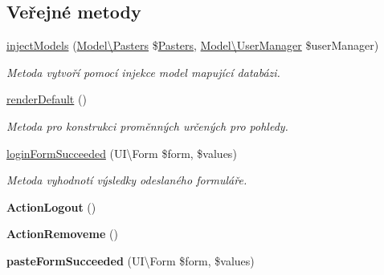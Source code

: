 \subsection*{Veřejné metody}
\begin{DoxyCompactItemize}
\item 
\hyperlink{classApp_1_1Presenters_1_1HomepagePresenter_a9f3ca2d8ad95a60ccbcce5566eb2a1f3}{inject\-Models} (\hyperlink{classApp_1_1Model_1_1Pasters}{Model\textbackslash{}\-Pasters} \$\hyperlink{classApp_1_1Model_1_1Pasters}{Pasters}, \hyperlink{classApp_1_1Model_1_1UserManager}{Model\textbackslash{}\-User\-Manager} \$user\-Manager)
\begin{DoxyCompactList}\small\item\em Metoda vytvoří pomocí injekce model mapující databázi. \end{DoxyCompactList}\item 
\hypertarget{classApp_1_1Presenters_1_1HomepagePresenter_a6903224ecfc8b81b2ab3269f574da84f}{\hyperlink{classApp_1_1Presenters_1_1HomepagePresenter_a6903224ecfc8b81b2ab3269f574da84f}{render\-Default} ()}\label{classApp_1_1Presenters_1_1HomepagePresenter_a6903224ecfc8b81b2ab3269f574da84f}

\begin{DoxyCompactList}\small\item\em Metoda pro konstrukci proměnných určených pro pohledy. \end{DoxyCompactList}\item 
\hyperlink{classApp_1_1Presenters_1_1HomepagePresenter_af63c0f54a5c4f89f36efecc4a84b8366}{login\-Form\-Succeeded} (U\-I\textbackslash{}\-Form \$form, \$values)
\begin{DoxyCompactList}\small\item\em Metoda vyhodnotí výsledky odeslaného formuláře. \end{DoxyCompactList}\item 
\hypertarget{classApp_1_1Presenters_1_1HomepagePresenter_aeb9f0e1d86324ec6d824b4b3de07cec7}{{\bfseries Action\-Logout} ()}\label{classApp_1_1Presenters_1_1HomepagePresenter_aeb9f0e1d86324ec6d824b4b3de07cec7}

\item 
\hypertarget{classApp_1_1Presenters_1_1HomepagePresenter_a8b8ecf6b3adccfc0d094586c48c27194}{{\bfseries Action\-Removeme} ()}\label{classApp_1_1Presenters_1_1HomepagePresenter_a8b8ecf6b3adccfc0d094586c48c27194}

\item 
\hypertarget{classApp_1_1Presenters_1_1HomepagePresenter_a21a1f43ddd9f04bf126fbb59670c64ad}{{\bfseries paste\-Form\-Succeeded} (U\-I\textbackslash{}\-Form \$form, \$values)}\label{classApp_1_1Presenters_1_1HomepagePresenter_a21a1f43ddd9f04bf126fbb59670c64ad}

\end{DoxyCompactItemize}
